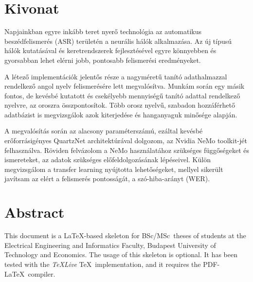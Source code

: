 \setcounter{page}{1}

\selecthungarian

\chapter*{Kivonat}

Napjainkban egyre inkább teret nyerő technológia az automatikus beszédfelismerés (ASR) területén a neurális hálók alkalmazása. Az új típusú hálók kutatásával és keretrendszerek fejlesztésével egyre könnyebben és gyorsabban lehet elérni jobb, pontosabb felismerési eredményeket.

A létező implementációk jelentős része a nagyméretű tanító adathalmazzal rendelkező angol nyelv felismerésére lett megvalósítva. Munkám során egy másik fontos, de kevésbé kutatott és csekélyebb mennyiségű tanító adattal rendelkező nyelvre, az oroszra összpontosítok. Több orosz nyelvű, szabadon hozzáférhető adatbázist is megvizsgálok azok kiterjedése és hanganyaguk minősége alapján.

A megvalósítás során az alacsony paraméterszámú, ezáltal kevésbé erőforrásigényes QuartzNet architektúrával dolgozom, az Nvidia NeMo toolkit-jét felhasználva. Röviden felvázolom a NeMo használatához szükséges függőségeket és ismereteket, az adatok szükséges előfeldolgozásának lépéseivel. Külön megvizsgálom a transfer learning nyújtotta lehetőségeket, mellyel sikerült javítsam az elért a felismerés pontosságát, a szó-hiba-arányt (WER).

\vfill
\selectenglish


\chapter*{Abstract}

This document is a \LaTeX-based skeleton for BSc/MSc~theses of students at the Electrical Engineering and Informatics Faculty, Budapest University of Technology and Economics. The usage of this skeleton is optional. It has been tested with the \emph{TeXLive} \TeX~implementation, and it requires the PDF-\LaTeX~compiler.


\vfill
\selectthesislanguage

\setcounter{romanPage}{\value{page}}
